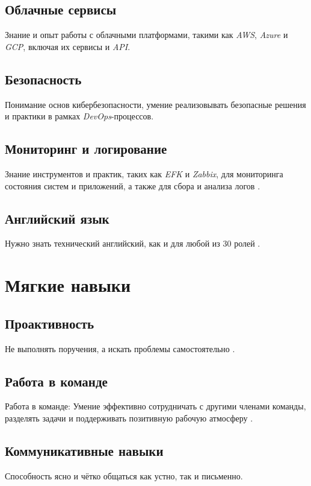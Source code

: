 \documentclass[variant=practice]{bsuir}
\begin{document}
\subsection{Облачные сервисы} Знание и опыт работы с облачными платформами,
такими как \textit{AWS}, \textit{Azure} и \textit{GCP}, включая их сервисы и
\textit{API}.

\subsection{Безопасность} Понимание основ кибербезопасности, умение
реализовывать безопасные решения и практики в рамках \textit{DevOps}-процессов.

\subsection{Мониторинг и логирование} Знание инструментов и практик, таких как
\textit{EFK} и \textit{Zabbix}, для мониторинга состояния систем и приложений, а
также для сбора и анализа логов \cite{devops-mts}.

\subsection{Английский язык} Нужно знать технический английский, как и для любой
из 30 ролей \cite{devops-mts}.

\section{Мягкие навыки}

\subsection{Проактивность} Не выполнять поручения, а искать проблемы
самостоятельно \cite{devops-mts}.

\subsection{Работа в команде} Работа в команде: Умение эффективно сотрудничать с
другими членами команды, разделять задачи и поддерживать позитивную рабочую
атмосферу \cite{devops-mts}.

\subsection{Коммуникативные навыки} Способность ясно и чётко общаться как устно,
так и письменно.
\end{document}
